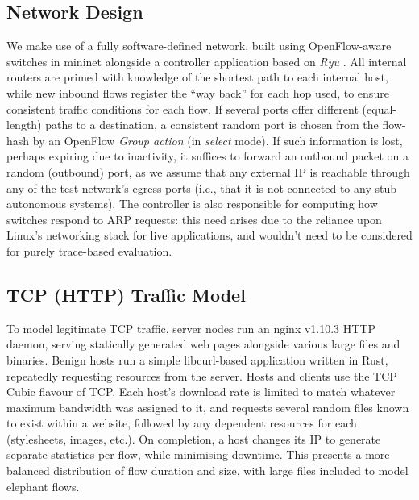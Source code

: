 \documentclass[10pt, times, comsoc]{IEEEtran}
\begin{document}
\subsection{Network Design}
We make use of a fully software-defined network, built using OpenFlow-aware switches in mininet alongside a controller application based on \emph{Ryu} \cite{ryu}.
All internal routers are primed with knowledge of the shortest path to each internal host, while new inbound flows register the ``way back'' for each hop used, to ensure consistent traffic conditions for each flow.
If several ports offer different (equal-length) paths to a destination, a consistent random port is chosen from the flow-hash by an OpenFlow \emph{Group action} (in \emph{select} mode).
If such information is lost, perhaps expiring due to inactivity, it suffices to forward an outbound packet on a random (outbound) port, as we assume that any external IP is reachable through any of the test network's egress ports (i.e., that it is not connected to any stub autonomous systems).
The controller is also responsible for computing how switches respond to ARP requests: this need arises due to the reliance upon Linux's networking stack for live applications, and wouldn't need to be considered for purely trace-based evaluation.

\subsection{TCP (HTTP) Traffic Model}
To model legitimate TCP traffic, server nodes run an nginx v1.10.3 HTTP daemon, serving statically generated web pages alongside various large files and binaries.
Benign hosts run a simple libcurl-based application written in Rust, repeatedly requesting resources from the server.
Hosts and clients use the TCP Cubic \cite{rfc8312} flavour of TCP.
Each host's download rate is limited to match whatever maximum bandwidth was assigned to it, and requests several random files known to exist within a website, followed by any dependent resources for each (stylesheets, images, etc.).
On completion, a host changes its IP to generate separate statistics per-flow, while minimising downtime.
This presents a more balanced distribution of flow duration and size, with large files included to model elephant flows.
\end{document}
